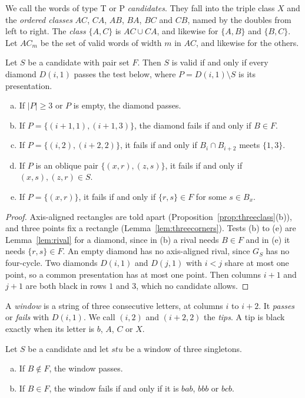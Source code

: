 We call the words of type T or P \emph{candidates}. They fall into the triple class $X$ and
the \emph{ordered classes} $AC$, $CA$, $AB$, $BA$, $BC$ and $CB$, named by the doubles from left
to right. The \emph{class} $\{A,C\}$ is $AC\cup CA$, and likewise for $\{A,B\}$ and
$\{B,C\}$. Let $AC_m$ be the set of valid words of width $m$ in $AC$, and likewise for the others.

\begin{lemma}\label{lem:diamond}
Let $S$ be a candidate with pair set $F$. Then $S$ is valid if and only if every diamond
$D(i,1)$ passes the test below, where $P=D(i,1)\setminus S$ is its presentation.
\begin{enumerate}[(a)]
\item If $|P|\ge3$ or $P$ is empty, the diamond passes.
\item If $P=\{(i+1,1),(i+1,3)\}$, the diamond fails if and only if $B\in F$.
\item If $P=\{(i,2),(i+2,2)\}$, it fails if and only if $B_i\cap B_{i+2}$ meets $\{1,3\}$.
\item If $P$ is an oblique pair $\{(x,r),(z,s)\}$, it fails if and only if $(x,s),(z,r)\in S$.
\item If $P=\{(x,r)\}$, it fails if and only if $\{r,s\}\in F$ for some $s\in B_x$.
\end{enumerate}
\end{lemma}

\begin{proof}
Axis-aligned rectangles are told apart (Proposition~\ref{prop:threeclass}(b)), and three points
fix a rectangle (Lemma~\ref{lem:threecorners}). Tests (b) to (e) are Lemma~\ref{lem:rival} for a
diamond, since in (b) a rival needs $B\in F$ and in (e) it needs $\{r,s\}\in F$. An empty
diamond has no axis-aligned rival, since $G_S$ has no four-cycle. Two diamonds $D(i,1)$
and $D(j,1)$ with $i<j$ share at most one point, so a common presentation has at most one point.
Then columns $i+1$ and $j+1$ are both black in rows $1$ and $3$, which no candidate allows.
\end{proof}

A \emph{window} is a string of three consecutive letters, at columns $i$ to $i+2$. It
\emph{passes} or \emph{fails} with $D(i,1)$. We call $(i,2)$ and $(i+2,2)$ the
\emph{tips}. A tip is black exactly when its letter is $b$, $A$, $C$ or $X$.

\begin{lemma}\label{lem:dichotomy}
Let $S$ be a candidate and let $stu$ be a window of three singletons.
\begin{enumerate}[(a)]
\item If $B\notin F$, the window passes.
\item If $B\in F$, the window fails if and only if it is $bab$, $bbb$ or $bcb$.
\end{enumerate}
\end{lemma}

